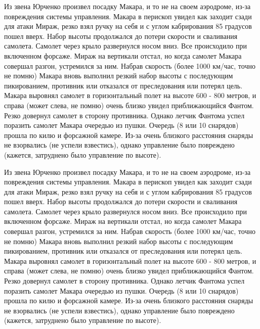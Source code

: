 \begin{textcitation}
	Из звена Юрченко произвел посадку Макара, и то не на своем аэродроме, из-за повреждения системы управления. Макара в перископ увидел как заходит сзади для атаки Мираж, резко взял ручку на себя и с углом кабрирования 85 градусов пошел вверх. Набор высоты продолжался до потери скорости и сваливания самолета. Самолет через крыло развернулся носом вниз. Все происходило при включенном форсаже. Мираж на вертикали отстал, но когда самолет Макара совершал разгон, устремился за ним. Набрав скорость (более 1000 км/час, точно не помню) Макара вновь выполнил резкий набор высоты с последующим пикированием, противник или отказался от преследования или потерял цель. Макара выровнял самолет в горизонтальный полет на высоте 600 - 800 метров, и справа (может слева, не помню) очень близко увидел приближающийся Фантом. Резко довернул самолет в сторону противника. Однако летчик Фантома успел поразить самолет Макара очередью из пушки. Очередь (8 или 10 снарядов) прошла по килю и форсажной камере. Из-за очень близкого расстояния снаряды не взорвались (не успели взвестись), однако управление было повреждено (кажется, затруднено было управление по высоте).
\end{textcitation}

\begin{textcitation}
	Из звена Юрченко произвел посадку Макара, и то не на своем аэродроме, из-за повреждения системы управления. Макара в перископ увидел как заходит сзади для атаки Мираж, резко взял ручку на себя и с углом кабрирования 85 градусов пошел вверх. Набор высоты продолжался до потери скорости и сваливания самолета. Самолет через крыло развернулся носом вниз. Все происходило при включенном форсаже. Мираж на вертикали отстал, но когда самолет Макара совершал разгон, устремился за ним. Набрав скорость (более 1000 км/час, точно не помню) Макара вновь выполнил резкий набор высоты с последующим пикированием, противник или отказался от преследования или потерял цель. Макара выровнял самолет в горизонтальный полет на высоте 600 - 800 метров, и справа (может слева, не помню) очень близко увидел приближающийся Фантом. Резко довернул самолет в сторону противника. Однако летчик Фантома успел поразить самолет Макара очередью из пушки. Очередь (8 или 10 снарядов) прошла по килю и форсажной камере. Из-за очень близкого расстояния снаряды не взорвались (не успели взвестись), однако управление было повреждено (кажется, затруднено было управление по высоте).
\end{textcitation}


